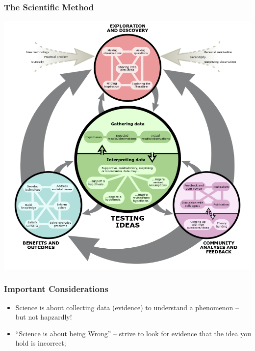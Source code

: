 \documentclass{beamer}
\begin{document}
\begin{frame}
  \frametitle{The Scientific Method}
  \begin{center}
    \includegraphics[height=.8\textheight]{img/understand}
  \end{center}
\end{frame}


\begin{frame}
  \frametitle{Important Considerations}
  \begin{itemize}
    \item Science is about collecting data (evidence) to understand a
      phenomenon -- but not hapzardly!
    \item ``Science is about being Wrong'' -- strive to look for
      evidence that the idea you hold is incorrect;
  \end{itemize}
\end{frame}
\end{document}
